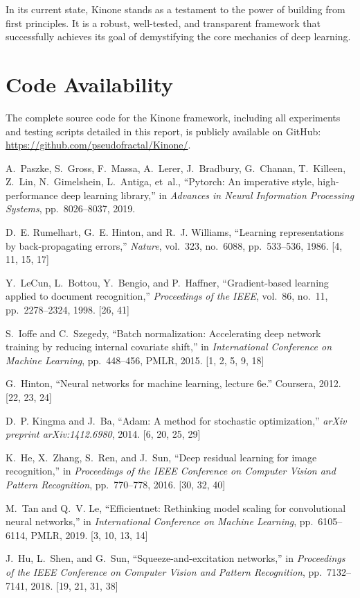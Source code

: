 \documentclass[a4paper]{article}
\begin{document}
In its current state, Kinone stands as a testament to the power of building from first principles. It is a robust, well-tested, and transparent framework that successfully achieves its goal of demystifying the core mechanics of deep learning.

\section{Code Availability}
The complete source code for the Kinone framework, including all experiments and testing scripts detailed in this report, is publicly available on GitHub: \url{https://github.com/pseudofractal/Kinone/}.

\pagebreak
\begin{thebibliography}{1}

A.~Paszke, S.~Gross, F.~Massa, A.~Lerer, J.~Bradbury, G.~Chanan, T.~Killeen, Z.~Lin, N.~Gimelshein, L.~Antiga, et~al., ``Pytorch: An imperative style, high-performance deep learning library,'' in {\em Advances in Neural Information Processing Systems}, pp.~8026--8037, 2019.

D.~E. Rumelhart, G.~E. Hinton, and R.~J. Williams, ``Learning representations by back-propagating errors,'' {\em Nature}, vol.~323, no.~6088, pp.~533--536, 1986. [4, 11, 15, 17]

Y.~LeCun, L.~Bottou, Y.~Bengio, and P.~Haffner, ``Gradient-based learning applied to document recognition,'' {\em Proceedings of the IEEE}, vol.~86, no.~11, pp.~2278--2324, 1998. [26, 41]

S.~Ioffe and C.~Szegedy, ``Batch normalization: Accelerating deep network training by reducing internal covariate shift,'' in {\em International Conference on Machine Learning}, pp.~448--456, PMLR, 2015. [1, 2, 5, 9, 18]

G.~Hinton, ``Neural networks for machine learning, lecture 6e.'' Coursera, 2012. [22, 23, 24]

D.~P. Kingma and J.~Ba, ``Adam: A method for stochastic optimization,'' {\em arXiv preprint arXiv:1412.6980}, 2014. [6, 20, 25, 29]

K.~He, X.~Zhang, S.~Ren, and J.~Sun, ``Deep residual learning for image recognition,'' in {\em Proceedings of the IEEE Conference on Computer Vision and Pattern Recognition}, pp.~770--778, 2016. [30, 32, 40]

M.~Tan and Q.~V. Le, ``Efficientnet: Rethinking model scaling for convolutional neural networks,'' in {\em International Conference on Machine Learning}, pp.~6105--6114, PMLR, 2019. [3, 10, 13, 14]

J.~Hu, L.~Shen, and G.~Sun, ``Squeeze-and-excitation networks,'' in {\em Proceedings of the IEEE Conference on Computer Vision and Pattern Recognition}, pp.~7132--7141, 2018. [19, 21, 31, 38]

\end{thebibliography}
\end{document}
